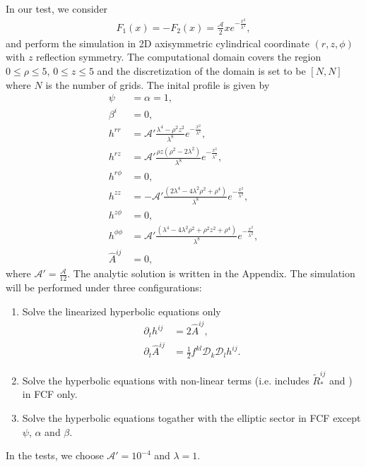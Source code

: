 In our test, we consider 
\begin{align}
    F_1 (x) = - F_2 (x) = \frac{\mathcal{A}}{2} x e^{-\frac{x^2}{\lambda^2}},
\end{align}
and perform the simulation in 2D axisymmetric cylindrical coordinate $(r,z,\phi)$ with $z$ reflection symmetry.
The computational domain covers the region $0\leq \rho \leq 5$, $0\leq z \leq 5$
and the discretization of the domain is set to be $[N,N]$ where $N$ is the number of grids.
The inital profile is given by
\begin{align}
    \psi &= \alpha = 1, \\
    \beta^i &= 0, \\
    h^{rr} &= \mathcal{A}' \frac{\lambda^4 - \rho^2 z^2}{\lambda^8} e^{-\frac{x^2}{\lambda^2}}, \\
    h^{r z} &= \mathcal{A}' \frac{\rho z \left(\rho^2 - 2 \lambda^2 \right)}{\lambda^8} e^{-\frac{x^2}{\lambda^2}}, \\
    h^{r \phi} &= 0, \\
    h^{zz} &= - \mathcal{A}' \frac{\left(2 \lambda^4 - 4 \lambda^2 \rho^2 + \rho^4 \right)}{\lambda^8} e^{-\frac{x^2}{\lambda^2}}, \\
    h^{z\phi} &= 0, \\
    h^{\phi\phi} &= \mathcal{A}' \frac{\left(\lambda^4 - 4 \lambda^2 \rho^2 +\rho^2 z^2 + \rho^4 \right)}{\lambda^8} e^{-\frac{x^2}{\lambda^2}}, \\
    \hat{A}^{ij} &= 0,
\end{align}
where $\mathcal{A}' = \frac{\mathcal{A}}{12}$.
The analytic solution is written in the Appendix.
The simulation will be performed under three configurations:
\begin{enumerate}
    \item Solve the linearized hyperbolic equations only
    \begin{align}
        \partial_t h^{ij} &= 2 \hat{A}^{ij}, \\
        \partial_t \hat{A}^{ij} &= \frac{1}{2} f^{kl} \mathcal{D}_k \mathcal{D}_l h^{ij}.
    \end{align}
    \item Solve the hyperbolic equations with non-linear terms (i.e. includes $\tilde{R}^{ij}_*$ and ) in FCF only.
    \item Solve the hyperbolic equations togather with the elliptic sector in FCF except $\psi$, $\alpha$ and $\beta$.
\end{enumerate}
In the tests, we choose $\mathcal{A}'=10^{-4}$ and $\lambda=1$.

